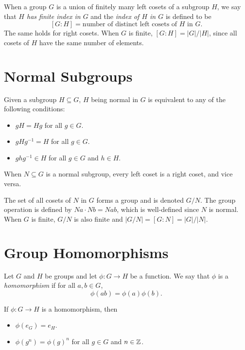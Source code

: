 \documentclass{amsart}
\begin{document}
\begin{definition}
	When a group $G$ is a union of finitely many left cosets of a subgroup $H$,
	we say that \emph{$H$ has finite index in $G$} and the \emph{index of $H$ in
	$G$} is defined to be
	\[[G : H] = \text{number of distinct left cosets of $H$ in $G$}.\]
	The same holds for right cosets. When $G$ is finite, $[G : H] = |G|/|H|$,
	since all cosets of $H$ have the same number of elements.
\end{definition}

\section*{Normal Subgroups}

\begin{theorem}
	Given a subgroup $H \subseteq G$, $H$ being normal in $G$ is equivalent to
	any of the following conditions:
	\begin{itemize}
		\item $gH = Hg$ for all $g \in G$.
		\item $gHg^{-1} = H$ for all $g \in G$.
		\item $ghg^{-1} \in H$ for all $g \in G$ and $h \in H$.
	\end{itemize}
\end{theorem}

\begin{corollary}
	When $N \subseteq G$ is a normal subgroup, every left coset is a right
	coset, and vice versa.
\end{corollary}

\begin{theorem}
	The set of all cosets of $N$ in $G$ forms a group and is denoted $G/N$. The
	group operation is defined by $Na \cdot Nb = Nab$, which is well-defined
	since $N$ is normal. When $G$ is finite, $G/N$ is also finite and $|G/N| =
	[G : N] = |G|/|N|$.
\end{theorem}

\section*{Group Homomorphisms}

\begin{definition}
	Let $G$ and $H$ be groups and let $\phi : G \rightarrow H$ be a function. We
	say that $\phi$ is a \emph{homomorphism} if for all $a, b \in G$,
	\[\phi(ab) = \phi(a) \phi(b).\]
\end{definition}

\begin{theorem}
	If $\phi : G \rightarrow H$ is a homomorphism, then
	\begin{itemize}
		\item $\phi(e_G) = e_H$.
		\item $\phi(g^n) = {\phi(g)}^n$ for all $g \in G$ and $n \in {\mathbb{Z}}$.
	\end{itemize}
\end{theorem}
\end{document}
